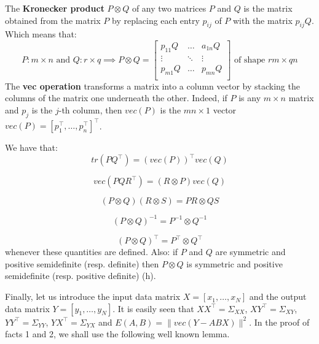 The \textbf{Kronecker product} $P \otimes Q$ of any two matrices $P$ and $Q$ is the matrix obtained from the matrix $P$ by replacing each entry $p_{ij}$ of $P$ with the matrix $p_{ij}Q$. Which means that:
\[P: m\times n \text{ and } Q:r\times q \implies 
P \otimes Q = \begin{bmatrix}
    p_{11}Q & \dots & a_{1n}Q\\
    \vdots & \ddots & \vdots\\
    p_{m1}Q & \dots & p_{mn}Q\\
\end{bmatrix}
\text{ of shape } rm\times qn
\]
The \textbf{vec operation} transforms a matrix into a column vector by stacking the columns of the matrix one underneath the other. Indeed, if $P$ is any $m \times n$ matrix and $p_j$ is the $j$-th column, then $vec(P)$ is the $mn\times 1$ vector $vec(P) = [p_1^\intercal, \dots, p_n^\intercal]^\intercal$.

We have that:
\begin{equation} \tag{c}
    tr(PQ^\intercal) = (vec(P))^\intercal vec(Q)
\end{equation}

\begin{equation} \tag{d}
    vec(PQR^\intercal) = (R \otimes P) vec(Q)
\end{equation}

\begin{equation} \tag{e}
    (P \otimes Q)(R \otimes S) = PR \otimes QS
\end{equation}

\begin{equation} \tag{f}
    (P \otimes Q)^{-1} = P^{-1} \otimes Q^{-1}
\end{equation}

\begin{equation} \tag{g}
    (P \otimes Q)^\intercal = P^\intercal \otimes Q^\intercal
\end{equation}
whenever these quantities are defined. Also: if $P$ and $Q$ are symmetric and positive semidefinite (resp. definite) then $P \otimes Q$ is symmetric and positive semidefinite (resp. positive definite) (h).

Finally, let us introduce the input data matrix $X = [x_1, \dots, x_N]$ and the output data matrix $Y=[y_1, \dots, y_N]$. It is easily seen that $XX^\intercal = \Sigma_{XX}$, $XY^\intercal = \Sigma_{XY}$, $YY^\intercal = \Sigma_{YY}$, $YX^\intercal = \Sigma_{YX}$ and $E(A,B) = \|vec(Y - ABX)\|^2$. In the proof of facts 1 and 2, we shall use the following well known lemma.

